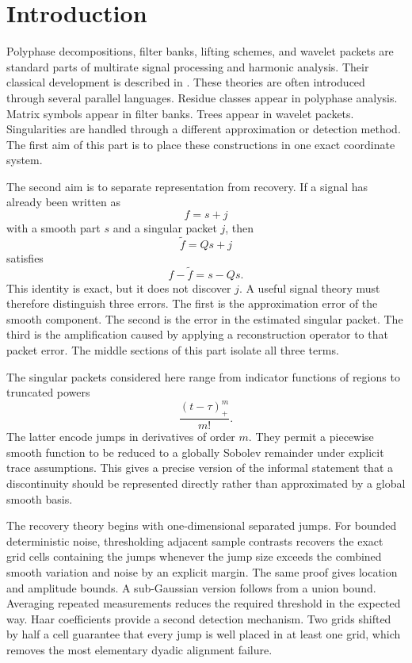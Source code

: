 \documentclass[11pt,letterpaper]{article}
\theoremstyle{plain}
\theoremstyle{plain}
\theoremstyle{plain}
\theoremstyle{definition}
\theoremstyle{definition}
\theoremstyle{definition}
\theoremstyle{definition}
\theoremstyle{remark}
\theoremstyle{remark}
\theoremstyle{remark}
\theoremstyle{remark}
\begin{document}
\section{Introduction}\label{extension:section:01}\label{sec:introduction}

Polyphase decompositions, filter banks, lifting schemes, and wavelet packets are standard parts of multirate signal processing and harmonic analysis. Their classical development is described in \cite{CrochiereRabiner1983,Vaidyanathan1993,VetterliKovacevic1995,StrangNguyen1996,Daubechies1992,Mallat2009}. These theories are often introduced through several parallel languages. Residue classes appear in polyphase analysis. Matrix symbols appear in filter banks. Trees appear in wavelet packets. Singularities are handled through a different approximation or detection method. The first aim of this part is to place these constructions in one exact coordinate system.

The second aim is to separate representation from recovery. If a signal has already been written as
\[
f=s+j
\]
with a smooth part \(s\) and a singular packet \(j\), then
\[
\widetilde f=Qs+j
\]
satisfies
\[
f-\widetilde f=s-Qs.
\]
This identity is exact, but it does not discover \(j\). A useful signal theory must therefore distinguish three errors. The first is the approximation error of the smooth component. The second is the error in the estimated singular packet. The third is the amplification caused by applying a reconstruction operator to that packet error. The middle sections of this part isolate all three terms.

The singular packets considered here range from indicator functions of regions to truncated powers
\[
\frac{(t-\tau)_+^m}{m!}.
\]
The latter encode jumps in derivatives of order \(m\). They permit a piecewise smooth function to be reduced to a globally Sobolev remainder under explicit trace assumptions. This gives a precise version of the informal statement that a discontinuity should be represented directly rather than approximated by a global smooth basis.

The recovery theory begins with one-dimensional separated jumps. For bounded deterministic noise, thresholding adjacent sample contrasts recovers the exact grid cells containing the jumps whenever the jump size exceeds the combined smooth variation and noise by an explicit margin. The same proof gives location and amplitude bounds. A sub-Gaussian version follows from a union bound. Averaging repeated measurements reduces the required threshold in the expected way. Haar coefficients provide a second detection mechanism. Two grids shifted by half a cell guarantee that every jump is well placed in at least one grid, which removes the most elementary dyadic alignment failure.
\end{document}
